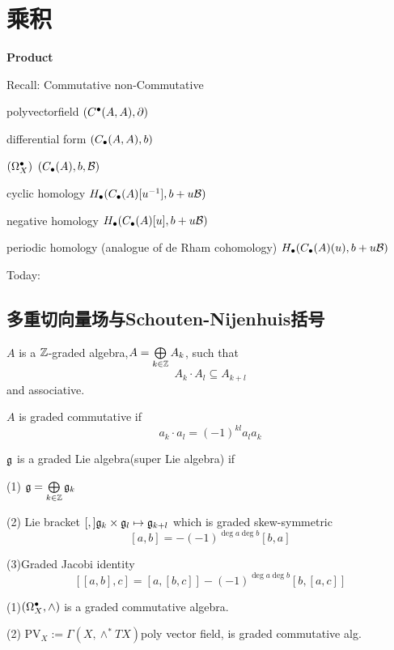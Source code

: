 \chapter{乘积}

\textbf{Product}

Recall:
Commutative                 non-Commutative

polyvectorfield             $(C^{\bullet}(A,A),\partial)$

differential form           $(C_{\bullet}(A,A),b)$

$(\Omega_X^{\bullet})$            $(C_{\bullet}(A),b,\mathcal{B})$

cyclic homology  $H_{\bullet}(C_{\bullet}(A)[u^{-1}],b+u\mathcal{B})$

negative homology  $H_{\bullet}(C_{\bullet}(A)[u],b+u\mathcal{B})$

periodic homology  (analogue of de Rham cohomology)
$H_{\bullet}(C_{\bullet}(A)(u),b+u\mathcal{B})$

Today:

\section{多重切向量场与Schouten-Nijenhuis括号}

\begin{definition}
$A$ is a $\mathbb{Z}$-graded algebra,$A=\bigoplus\limits_{k\in\mathbb{Z}}A_k$,
such that
$$A_k\cdot A_l\subseteq A_{k+l}$$
and associative.

$A$ is graded commutative if
$$a_k\cdot a_l=(-1)^{kl}a_la_k$$
\end{definition}

\begin{definition}
$\mathfrak{g}$ is a graded Lie algebra(super Lie algebra)
if

(1) $\mathfrak{g}=\bigoplus\limits_{k\in\mathbb{Z}}\mathfrak{g}_k$

(2) Lie bracket $[,] \mathfrak{g}_k\times\mathfrak{g}_l\mapsto\mathfrak{g}_{k+l}$
which is graded skew-symmetric
$$[a,b]=-(-1)^{\deg a\deg b}[b,a]$$

(3)Graded Jacobi identity
$$[[a,b],c]=[a,[b,c]]-(-1)^{\deg a\deg b}[b,[a,c]]$$
\end{definition}


\begin{example}
(1)$(\Omega_X^{\bullet},\wedge)$ is a graded commutative algebra.

(2) $\text{PV}_X:=\Gamma(X,\wedge^*TX)$poly vector field,
is graded commutative alg.
\end{example}

